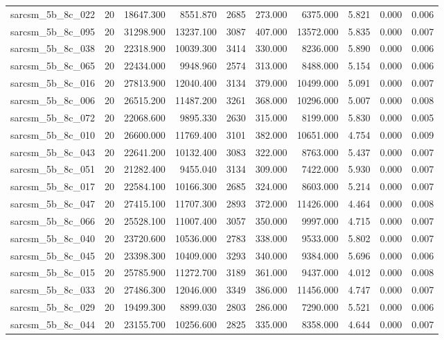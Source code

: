 \begin{tabular}{lrrrrrrrrr}
sarcsm\_5b\_8c\_022 & 20 & 18647.300 & 8551.870 & 2685 & 273.000 & 6375.000 & 5.821 & 0.000 & 0.006 \\
sarcsm\_5b\_8c\_095 & 20 & 31298.900 & 13237.100 & 3087 & 407.000 & 13572.000 & 5.835 & 0.000 & 0.007 \\
sarcsm\_5b\_8c\_038 & 20 & 22318.900 & 10039.300 & 3414 & 330.000 & 8236.000 & 5.890 & 0.000 & 0.006 \\
sarcsm\_5b\_8c\_065 & 20 & 22434.000 & 9948.960 & 2574 & 313.000 & 8488.000 & 5.154 & 0.000 & 0.006 \\
sarcsm\_5b\_8c\_016 & 20 & 27813.900 & 12040.400 & 3134 & 379.000 & 10499.000 & 5.091 & 0.000 & 0.007 \\
sarcsm\_5b\_8c\_006 & 20 & 26515.200 & 11487.200 & 3261 & 368.000 & 10296.000 & 5.007 & 0.000 & 0.008 \\
sarcsm\_5b\_8c\_072 & 20 & 22068.600 & 9895.330 & 2630 & 315.000 & 8199.000 & 5.830 & 0.000 & 0.005 \\
sarcsm\_5b\_8c\_010 & 20 & 26600.000 & 11769.400 & 3101 & 382.000 & 10651.000 & 4.754 & 0.000 & 0.009 \\
sarcsm\_5b\_8c\_043 & 20 & 22641.200 & 10132.400 & 3083 & 322.000 & 8763.000 & 5.437 & 0.000 & 0.007 \\
sarcsm\_5b\_8c\_051 & 20 & 21282.400 & 9455.040 & 3134 & 309.000 & 7422.000 & 5.930 & 0.000 & 0.007 \\
sarcsm\_5b\_8c\_017 & 20 & 22584.100 & 10166.300 & 2685 & 324.000 & 8603.000 & 5.214 & 0.000 & 0.007 \\
sarcsm\_5b\_8c\_047 & 20 & 27415.100 & 11707.300 & 2893 & 372.000 & 11426.000 & 4.464 & 0.000 & 0.008 \\
sarcsm\_5b\_8c\_066 & 20 & 25528.100 & 11007.400 & 3057 & 350.000 & 9997.000 & 4.715 & 0.000 & 0.007 \\
sarcsm\_5b\_8c\_040 & 20 & 23720.600 & 10536.000 & 2783 & 338.000 & 9533.000 & 5.802 & 0.000 & 0.007 \\
sarcsm\_5b\_8c\_045 & 20 & 23398.300 & 10409.000 & 3293 & 340.000 & 9384.000 & 5.696 & 0.000 & 0.006 \\
sarcsm\_5b\_8c\_015 & 20 & 25785.900 & 11272.700 & 3189 & 361.000 & 9437.000 & 4.012 & 0.000 & 0.008 \\
sarcsm\_5b\_8c\_033 & 20 & 27486.300 & 12046.000 & 3349 & 386.000 & 11456.000 & 4.747 & 0.000 & 0.007 \\
sarcsm\_5b\_8c\_029 & 20 & 19499.300 & 8899.030 & 2803 & 286.000 & 7290.000 & 5.521 & 0.000 & 0.006 \\
sarcsm\_5b\_8c\_044 & 20 & 23155.700 & 10256.600 & 2825 & 335.000 & 8358.000 & 4.644 & 0.000 & 0.007 \\

\end{tabular}
